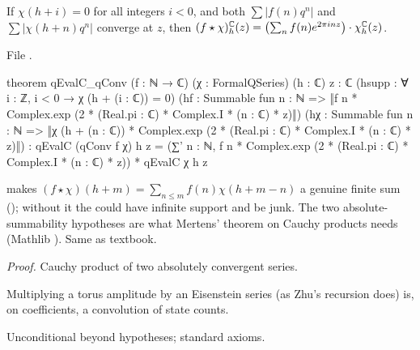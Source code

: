 \begin{theorem}\label{l14:thm:qconv}
If $\chi(h+i) = 0$ for all integers $i<0$, and both $\sum|f(n)q^n|$ and $\sum|\chi(h+n)q^n|$ converge at $z$, then
$(f\star\chi)^{{\mathbb{C}}}_h(z) = \bigl(\sum_nf(n)e^{2\pi inz}\bigr)\cdot\chi^{{\mathbb{C}}}_h(z)$.
\end{theorem}
\noindent File .
\begin{leancode}
theorem qEvalC_qConv (f : ℕ → ℂ) (χ : FormalQSeries) (h : ℂ) {z : ℂ}
    (hsupp : ∀ i : ℤ, i < 0 → χ (h + (i : ℂ)) = 0)
    (hf : Summable fun n : ℕ => ‖f n * Complex.exp (2 * (Real.pi : ℂ) * Complex.I * (n : ℂ) * z)‖)
    (hχ : Summable fun n : ℕ =>
      ‖χ (h + (n : ℂ)) * Complex.exp (2 * (Real.pi : ℂ) * Complex.I * (n : ℂ) * z)‖) :
    qEvalC (qConv f χ) h z
      = (∑' n : ℕ, f n * Complex.exp (2 * (Real.pi : ℂ) * Complex.I * (n : ℂ) * z))
          * qEvalC χ h z
\end{leancode}
\begin{dictionary}
 makes $(f\star\chi)(h+m) = \sum_{n\le m}f(n)\chi(h+m-n)$ a genuine finite sum ();
without it the  could have infinite support and be junk. The two absolute-summability hypotheses are what
Mertens' theorem on Cauchy products needs (Mathlib ). Same as textbook.
\end{dictionary}
\noindent\emph{Proof.} Cauchy product of two absolutely convergent series.
\begin{physics}
Multiplying a torus amplitude by an Eisenstein series (as Zhu's recursion does) is, on coefficients, a convolution of state
counts.
\end{physics}
\begin{status}
Unconditional beyond hypotheses; standard axioms.
\end{status}

